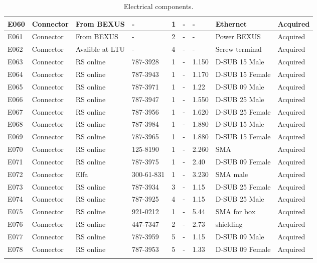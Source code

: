 \begin{longtable}{|m{}|m{}|m{}|m{}|m{}|m{}|m{}|m{}|m{}|}
E060 &	Connector	&	From BEXUS &-	& 1	& -	&	-	& Ethernet	& Acquired \\ \hline
E061 &	Connector	&	From BEXUS &-	& 2	& -	&	-	& Power BEXUS	& Acquired \\ \hline
E062 &	Connector	&	Avalible at LTU  &-	& 4	& -	&	-	& Screw terminal	& Acquired \\ \hline
E063	&	Connector 	& RS online	& 787-3928 & 1	& -  & 1.150 & D-SUB 15 Male& Acquired \\ \hline
E064 &  Connector 	& RS online	& 787-3943 & 1	& -  & 1.170 & D-SUB 15 Female& Acquired \\ \hline
E065 &  Connector 	& RS online	& 787-3971 & 1	& -  & 1.22 &D-SUB 09 Male & Acquired \\ \hline
E066 &  Connector 	& RS online	& 787-3947 & 1	& -  & 1.550 &D-SUB 25 Male & Acquired \\ \hline
E067 &  Connector 	& RS online	& 787-3956 & 1	& -  & 1.620 &D-SUB 25 Female & Acquired \\ \hline
E068 &  Connector 	& RS online	& 787-3984 & 1	& -  & 1.880 &D-SUB 15 Male & Acquired \\ \hline
E069 &  Connector 	& RS online	& 787-3965 & 1	& -  & 1.880 &D-SUB 15 Female & Acquired \\ \hline
E070 &  Connector 	& RS online	& 125-8190 & 1	& -  & 2.260 &SMA & Acquired \\ \hline
E071 &  Connector 	& RS online	&787-3975 & 1	& -  & 2.40 &D-SUB 09 Female& Acquired \\ \hline
E072 &  Connector 	& Elfa &300-61-831 & 1	& -  & 3.230 &SMA male& Acquired \\ \hline
E073 &  Connector 	& RS online	&787-3934 & 3	& -  & 1.15 &D-SUB 25 Female& Acquired \\ \hline
E074 &  Connector 	& RS online	&787-3925 & 4	& -  & 1.15 &D-SUB 25 Male& Acquired \\ \hline
E075 &  Connector 	& RS online	&921-0212& 1	& -  & 5.44 &SMA for box& Acquired \\ \hline
E076 &  Connector 	& RS online	&447-7347& 2	& -  & 2.73 &shielding& Acquired \\ \hline
E077 &  Connector 	& RS online	&787-3959& 5	& -  & 1.15 & D-SUB 09 Male& Acquired \\ \hline
E078 &  Connector 	& RS online	&787-3953& 5	& -  & 1.33 & D-SUB 09 Female& Acquired \\ \hline
 


\caption{Electrical components.}
\label{tab:component-elec}
\end{longtable}
\raggedbottom